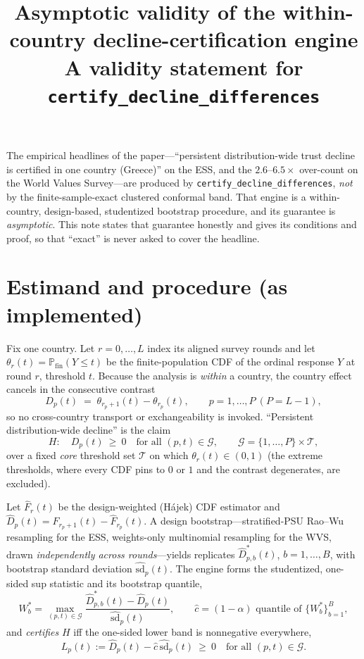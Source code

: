 \documentclass[12pt]{article}
\title{Asymptotic validity of the within-country decline-certification engine\\
\large A validity statement for \texttt{certify\_decline\_differences}}
\date{}
\theoremstyle{definition}
\theoremstyle{remark}
\newcommand{\Fhat}{\widehat F}
\newcommand{\Dhat}{\widehat D}
\newcommand{\sdhat}{\widehat{\mathrm{sd}}}
\renewcommand{\Pr}{\mathbb{P}}
\newcommand{\core}{\mathcal T}
\begin{document}
\maketitle

The empirical headlines of the paper---``persistent distribution-wide trust decline is
certified in one country (Greece)'' on the ESS, and the $2.6$--$6.5\times$ over-count on the
World Values Survey---are produced by \texttt{certify\_decline\_differences}, \emph{not} by
the finite-sample-exact clustered conformal band. That engine is a within-country,
design-based, studentized bootstrap procedure, and its guarantee is \emph{asymptotic}. This
note states that guarantee honestly and gives its conditions and proof, so that ``exact''
is never asked to cover the headline.

\section*{Estimand and procedure (as implemented)}

Fix one country. Let $r=0,\dots,L$ index its aligned survey rounds and let
$\theta_r(t)=\Pr_{\text{fin}}(Y\le t)$ be the finite-population CDF of the ordinal response
$Y$ at round $r$, threshold $t$. Because the analysis is \emph{within} a country, the
country effect cancels in the consecutive contrast
\[
  D_{p}(t)\;=\;\theta_{r_{p}+1}(t)-\theta_{r_p}(t),\qquad p=1,\dots,P\ (P=L-1),
\]
so no cross-country transport or exchangeability is invoked. ``Persistent
distribution-wide decline'' is the claim
\[
  H:\quad D_p(t)\ \ge\ 0\quad\text{for all }(p,t)\in \mathcal G,\qquad
  \mathcal G=\{1,\dots,P\}\times\core,
\]
over a fixed \emph{core} threshold set $\core$ on which $\theta_r(t)\in(0,1)$ (the extreme
thresholds, where every CDF pins to $0$ or $1$ and the contrast degenerates, are excluded).

Let $\Fhat_r(t)$ be the design-weighted (H\'ajek) CDF estimator and
$\Dhat_p(t)=\Fhat_{r_p+1}(t)-\Fhat_{r_p}(t)$. A design bootstrap---stratified-PSU
Rao--Wu resampling for the ESS, weights-only multinomial resampling for the WVS, drawn
\emph{independently across rounds}---yields replicates $\Dhat^{*}_{p,b}(t)$, $b=1,\dots,B$,
with bootstrap standard deviation $\sdhat_p(t)$. The engine forms the studentized,
one-sided sup statistic and its bootstrap quantile,
\[
  W^{*}_b=\max_{(p,t)\in\mathcal G}\frac{\Dhat^{*}_{p,b}(t)-\Dhat_p(t)}{\sdhat_p(t)},
  \qquad
  \widehat c=\text{$(1-\alpha)$ quantile of }\{W^{*}_b\}_{b=1}^{B},
\]
and \emph{certifies} $H$ iff the one-sided lower band is nonnegative everywhere,
\begin{equation}\label{eq:certify}
  L_p(t):=\Dhat_p(t)-\widehat c\,\sdhat_p(t)\ \ge\ 0\quad\text{for all }(p,t)\in\mathcal G.
\end{equation}
\end{document}

